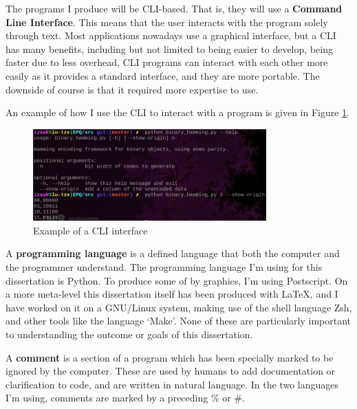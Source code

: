 \documentclass[a4paper,11pt]{article}
\begin{document}
    \begin{definition}
    The programs I produce will be CLI-based. That is, they will use a
    \textbf{Command Line Interface}. This means that the user interacts with the
    program solely through text. Most applications nowadays use a graphical
    interface, but a CLI has many benefits, including but not limited to being
    easier to develop, being faster due to less overhead, CLI programs can
    interact with each other more easily as it provides a standard interface,
    and they are more portable. The downside of course is that it required more
    expertise to use.

    An example of how I use the CLI to interact with a program is given in
    Figure \ref{fig:cliusage}.
    \end{definition}

\begin{figure}[H]
\begin{center}
\includegraphics[width=0.8\textwidth]{../images/cli_usage.png}
\end{center}
\caption{Example of a CLI interface}\label{fig:cliusage}
\end{figure}

    \begin{definition}
    A \textbf{programming language} is a defined language that both the computer
    and the programmer understand.  The programming language I'm using for this
    dissertation is Python. To produce some of by graphics, I'm using
    Postscript. On a more meta-level this dissertation itself has been produced
    with \LaTeX, and I have worked on it on a GNU/Linux system, making use of
    the shell language Zsh, and other tools like the language `Make'. None of
    these are particularly important to understanding the outcome or goals of
    this dissertation.
    \end{definition}

    \begin{definition}
    A \textbf{comment} is a section of a program which has been specially marked
    to be ignored by the computer. These are used by humans to add documentation
    or clarification to code, and are written in natural language.  In the two
    languages I'm using, comments are marked by a preceding \% or \#.
    \end{definition}
\end{document}
